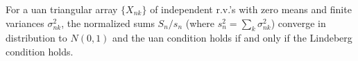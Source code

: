 For a uan triangular array $\{X_{nk}\}$ of independent r.v.'s with zero means and finite variances $\sigma_{nk}^2$, the normalized sums $S_n/s_n$ (where $s_n^2 = \sum_k \sigma_{nk}^2$) converge in distribution to $N(0,1)$ and the uan condition holds if and only if the Lindeberg condition holds.

